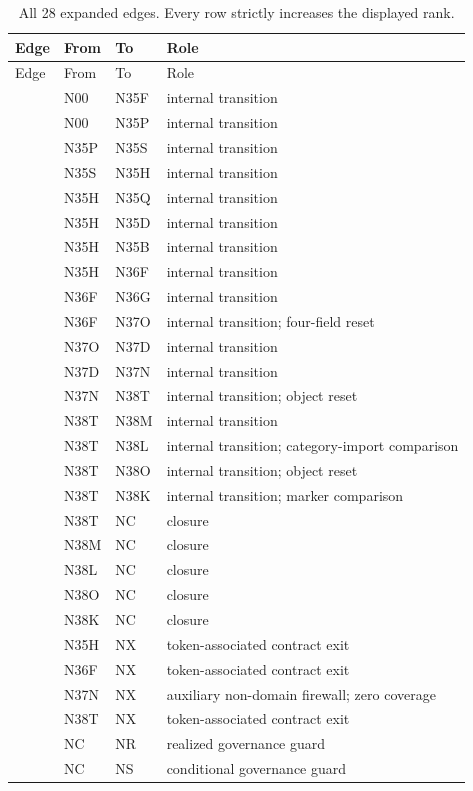 \begin{longtable}{@{}L{1.2cm}L{1.4cm}L{1.4cm}L{6.2cm}@{}}
\caption{All 28 expanded edges.  Every row strictly increases the displayed
rank.}\label{tab:edges}\\
\toprule
Edge & From & To & Role \\
\midrule
\endfirsthead
\toprule
Edge & From & To & Role \\
\midrule
\endhead
{} & N00 & N35F & internal transition \\
 & N00 & N35P & internal transition \\
 & N35P & N35S & internal transition \\
 & N35S & N35H & internal transition \\
 & N35H & N35Q & internal transition \\
 & N35H & N35D & internal transition \\
 & N35H & N35B & internal transition \\
 & N35H & N36F & internal transition \\
 & N36F & N36G & internal transition \\
 & N36F & N37O & internal transition; four-field reset \\
 & N37O & N37D & internal transition \\
 & N37D & N37N & internal transition \\
 & N37N & N38T & internal transition; object reset \\
 & N38T & N38M & internal transition \\
 & N38T & N38L & internal transition; category-import comparison \\
 & N38T & N38O & internal transition; object reset \\
 & N38T & N38K & internal transition; marker comparison \\
 & N38T & NC & closure \\
 & N38M & NC & closure \\
 & N38L & NC & closure \\
 & N38O & NC & closure \\
 & N38K & NC & closure \\
 & N35H & NX & token-associated contract exit \\
 & N36F & NX & token-associated contract exit \\
 & N37N & NX & auxiliary non-domain firewall; zero coverage \\
 & N38T & NX & token-associated contract exit \\
 & NC & NR & realized governance guard \\
 & NC & NS & conditional governance guard \\
\bottomrule
\end{longtable}

